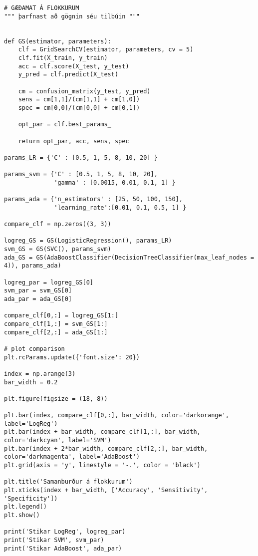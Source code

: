 \documentclass[11pt]{article}
\begin{document}
\begin{verbatim}
# GÆÐAMAT Á FLOKKURUM
""" þarfnast að gögnin séu tilbúin """


def GS(estimator, parameters):
    clf = GridSearchCV(estimator, parameters, cv = 5)
    clf.fit(X_train, y_train)
    acc = clf.score(X_test, y_test)
    y_pred = clf.predict(X_test)
    
    cm = confusion_matrix(y_test, y_pred)
    sens = cm[1,1]/(cm[1,1] + cm[1,0])
    spec = cm[0,0]/(cm[0,0] + cm[0,1])
    
    opt_par = clf.best_params_

    return opt_par, acc, sens, spec

params_LR = {'C' : [0.5, 1, 5, 8, 10, 20] }

params_svm = {'C' : [0.5, 1, 5, 8, 10, 20],
              'gamma' : [0.0015, 0.01, 0.1, 1] }

params_ada = {'n_estimators' : [25, 50, 100, 150], 
              'learning_rate':[0.01, 0.1, 0.5, 1] }

compare_clf = np.zeros((3, 3))

logreg_GS = GS(LogisticRegression(), params_LR)
svm_GS = GS(SVC(), params_svm)
ada_GS = GS(AdaBoostClassifier(DecisionTreeClassifier(max_leaf_nodes = 4)), params_ada)

logreg_par = logreg_GS[0]
svm_par = svm_GS[0]
ada_par = ada_GS[0]

compare_clf[0,:] = logreg_GS[1:]
compare_clf[1,:] = svm_GS[1:]
compare_clf[2,:] = ada_GS[1:]

# plot comparison
plt.rcParams.update({'font.size': 20})

index = np.arange(3)
bar_width = 0.2

plt.figure(figsize = (18, 8))

plt.bar(index, compare_clf[0,:], bar_width, color='darkorange', label='LogReg')
plt.bar(index + bar_width, compare_clf[1,:], bar_width, color='darkcyan', label='SVM')
plt.bar(index + 2*bar_width, compare_clf[2,:], bar_width, color='darkmagenta', label='AdaBoost')
plt.grid(axis = 'y', linestyle = '-.', color = 'black')

plt.title('Samanburður á flokkurum')
plt.xticks(index + bar_width, ['Accuracy', 'Sensitivity', 'Specificity'])
plt.legend()
plt.show()

print('Stikar LogReg', logreg_par)
print('Stikar SVM', svm_par)
print('Stikar AdaBoost', ada_par)
\end{verbatim}
\newpage
\end{document}
